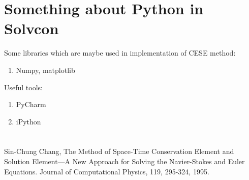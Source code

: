 \documentclass[a4paper,12pt,dvips]{article}
\begin{document}
\section{Something about Python in Solvcon}
Some libraries which are maybe used in implementation of CESE method: 
 \begin{enumerate}
  \item Numpy, matplotlib
 \end{enumerate}
Useful tools:
 \begin{enumerate}
  \item PyCharm
  \item iPython
 \end{enumerate}

\section{}


\begin{thebibliography}{99}
 Sin-Chung Chang, The Method of Space-Time Conservation Element and Solution Element—A New Approach for Solving the Navier-Stokes and Euler Equations. Journal of Computational Physics, 119, 295-324, 1995.
\end{thebibliography}
\end{document}
